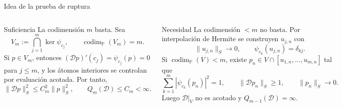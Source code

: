 \documentclass[aspectratio=169,10pt]{beamer}
\newcommand{\Poly}{\mathbb{P}}
\newcommand{\D}{\mathcal{D}}
\newcommand{\codim}{\operatorname{codim}}
\begin{document}
\begin{frame}{Idea de la prueba de ruptura}
  \footnotesize
  \setlength{\abovedisplayskip}{2pt}
  \setlength{\belowdisplayskip}{2pt}
  \setlength{\abovedisplayshortskip}{1pt}
  \setlength{\belowdisplayshortskip}{1pt}
  \begin{columns}[T,onlytextwidth]
    \begin{block}{Suficiencia}
      La codimensión \(m\) basta. Sea
      \[
        V_m:=\bigcap_{j=1}^m\ker\psi_{c_j},
        \qquad
        \codim_{\Poly}(V_m)=m.
      \]
      Si \(p\in V_m\), entonces \((\D p)'(c_j)=\psi_{c_j}(p)=0\) para \(j\le m\), y los átomos interiores se controlan por evaluación acotada. Por tanto,
      \[
        \|\D p\|_S^2\le C_m^2\|p\|_S^2,
        \qquad
        Q_m(\D)\le C_m<\infty.
      \]
    \end{block}

    \begin{block}{Necesidad}
      La codimensión \(<m\) no basta. Por interpolación de Hermite se construyen \(u_{j,n}\) con
      \[
        \|u_{j,n}\|_S\to0,
        \qquad
        \psi_{c_k}(u_{j,n})=\delta_{kj}.
      \]
      Si \(\codim_{\Poly}(V)<m\), existe \(p_n\in V\cap[u_{1,n},\dots,u_{m,n}]\) tal que
      \[
        \sum_{k=1}^m |\psi_{c_k}(p_n)|^2=1,
        \qquad
        \|\D p_n\|_S\ge 1,
        \qquad
        \|p_n\|_S\to0.
      \]
      Luego \(\D|_V\) no es acotado y \(Q_{m-1}(\D)=\infty\).
    \end{block}
  \end{columns}
\end{frame}
\end{document}
